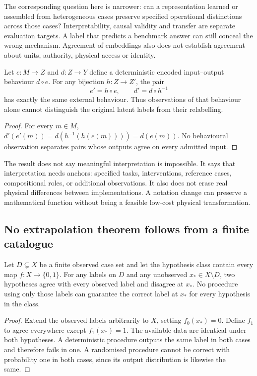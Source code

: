 The corresponding question here is narrower: can a representation learned or assembled from heterogeneous cases preserve specified operational distinctions across those cases? Interpretability, causal validity and transfer are separate evaluation targets. A label that predicts a benchmark answer can still conceal the wrong mechanism. Agreement of embeddings also does not establish agreement about units, authority, physical access or identity.

\begin{proposition}\label{prop:relabel}
Let $e:M\to Z$ and $d:Z\to Y$ define a deterministic encoded input--output behaviour $d\circ e$. For any bijection $h:Z\to Z'$, the pair
\[
 e'=h\circ e,\qquad d'=d\circ h^{-1}
\]
has exactly the same external behaviour. Thus observations of that behaviour alone cannot distinguish the original latent labels from their relabelling.
\end{proposition}
\begin{proof}
For every $m\in M$, $d'(e'(m))=d(h^{-1}(h(e(m))))=d(e(m))$. No behavioural observation separates pairs whose outputs agree on every admitted input.
\end{proof}

The result does not say meaningful interpretation is impossible. It says that interpretation needs anchors: specified tasks, interventions, reference cases, compositional roles, or additional observations. It also does not erase real physical differences between implementations. A notation change can preserve a mathematical function without being a feasible low-cost physical transformation.

\subsection{No extrapolation theorem follows from a finite catalogue}
\begin{proposition}\label{prop:finitecorpus}
Let $D\subsetneq X$ be a finite observed case set and let the hypothesis class contain every map $f:X\to\{0,1\}$. For any labels on $D$ and any unobserved $x_*\in X\setminus D$, two hypotheses agree with every observed label and disagree at $x_*$. No procedure using only those labels can guarantee the correct label at $x_*$ for every hypothesis in the class.
\end{proposition}
\begin{proof}
Extend the observed labels arbitrarily to $X$, setting $f_0(x_*)=0$. Define $f_1$ to agree everywhere except $f_1(x_*)=1$. The available data are identical under both hypotheses. A deterministic procedure outputs the same label in both cases and therefore fails in one. A randomised procedure cannot be correct with probability one in both cases, since its output distribution is likewise the same.
\end{proof}


